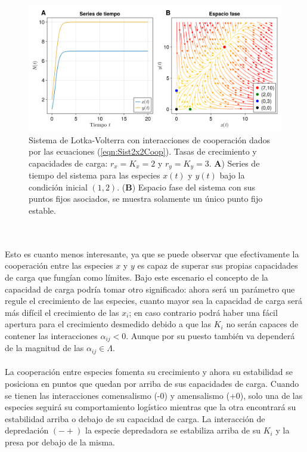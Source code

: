 \begin{ejemplo}
	\begin{figure}[h!]
		\centering
		\includegraphics[scale=0.24]{../Imagenes/Cooperacion de especies}
		\caption{Sistema de Lotka-Volterra con interacciones de cooperación dados por las ecuaciones (\ref{eqn:Sist2x2Coop}). Tasas de crecimiento y capacidades de carga: $r_x=K_x=2$ y $r_y=K_y=3$. \textbf{A}) Series de tiempo del sistema para las especies $x(t)$ y $y(t)$ bajo la condición inicial $(1,2)$. (\textbf{B}) Espacio fase del sistema con sus puntos fijos asociados, se muestra solamente un único punto fijo estable.}
		\label{fig:CooperacionEspecies}
	\end{figure}\\
	\\
	 Esto es cuanto menos interesante, ya que se puede observar que efectivamente la cooperación entre las especies $x$ y $y$ es capaz de superar sus propias capacidades de carga que fungían como límites. Bajo este escenario el concepto de la capacidad de carga podría tomar otro significado: ahora será un parámetro que regule el crecimiento de las especies, cuanto mayor sea la capacidad de carga será más difícil el crecimiento de las $x_i$; en caso contrario podrá haber una fácil apertura para el crecimiento desmedido debido a que las $K_i$ no serán capaces de contener las interacciones $\alpha_{ij}<0$. Aunque por su puesto también va dependerá de la magnitud de las $\alpha_{ij}\in\Lambda$.\\
	 \\
 	La cooperación entre especies fomenta su crecimiento y ahora su estabilidad se posiciona en puntos que quedan por arriba de sus capacidades de carga. Cuando se tienen las interacciones comensalismo (-0) y amensalismo (+0), solo una de las especies seguirá su comportamiento logístico mientras que la otra encontrará su estabilidad arriba o debajo de su capacidad de carga. La interacción de depredación $(-+)$ la especie depredadora se estabiliza arriba de su $K_i$ y la presa por debajo de la misma.\\

\end{ejemplo}
